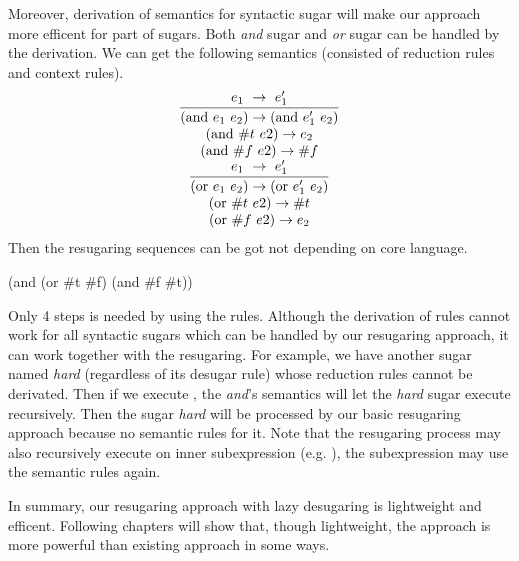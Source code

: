 Moreover, derivation of semantics for syntactic sugar will make our approach more efficent for part of sugars. Both \emph{and} sugar and \emph{or} sugar can be handled by the derivation. We can get the following semantics (consisted of reduction rules and context rules).
\[
\begin{array}{c}
\infer {(\mbox{and}~e_1~e_2) \rightarrow (\mbox{and}~e_1'~e_2)} {e_1~ \rightarrow~e_1'}\\
(\mbox{and}~\#t~e2) \rightarrow e_2 \\
(\mbox{and}~\#f~e2) \rightarrow \#f \\
\infer {(\mbox{or}~e_1~e_2) \rightarrow (\mbox{or}~e_1'~e_2)} {e_1~ \rightarrow~e_1'}\\
(\mbox{or}~\#t~e2) \rightarrow \#t \\
(\mbox{or}~\#f~e2) \rightarrow e_2 \\
\end{array}
\]
Then the resugaring sequences can be got not depending on core language.
\begin{Codes}
    (and (or \#t \#f) (and \#f \#t))
\end{Codes}

Only 4 steps is needed by using the rules. Although the derivation of rules cannot work for all syntactic sugars which can be handled by our resugaring approach, it can work together with the resugaring. For example, we have another sugar named \emph{hard} (regardless of its desugar rule) whose reduction rules cannot be derivated.
Then if we execute , the \emph{and}'s semantics will let the \emph{hard} sugar execute recursively. Then the sugar \emph{hard} will be processed by our basic resugaring approach because no semantic rules for it. Note that the resugaring process may also recursively execute on inner subexpression (e.g. ), the subexpression may use the semantic rules again.

In summary, our resugaring approach with lazy desugaring is lightweight and efficent. Following chapters will show that, though lightweight, the approach is more powerful than existing approach in some ways.
